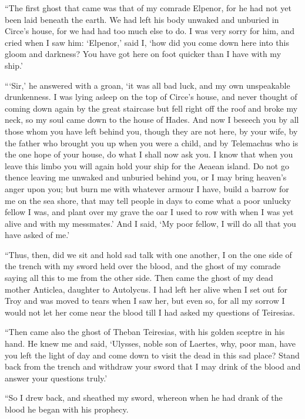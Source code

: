 “The first ghost that came was that of my comrade Elpenor, for he had not yet
been laid beneath the earth. We had left his body unwaked and unburied in
Circe’s house, for we had had too much else to do. I was very sorry for him,
and cried when I saw him: ‘Elpenor,’ said I, ‘how did you come down here into
this gloom and darkness? You have got here on foot quicker than I have with my
ship.’

“‘Sir,’ he answered with a groan, ‘it was all bad luck, and my own unspeakable
drunkenness. I was lying asleep on the top of Circe’s house, and never thought
of coming down again by the great staircase but fell right off the roof and
broke my neck, so my soul came down to the house of Hades. And now I beseech
you by all those whom you have left behind you, though they are not here, by
your wife, by the father who brought you up when you were a child, and by
Telemachus who is the one hope of your house, do what I shall now ask you. I
know that when you leave this limbo you will again hold your ship for the
Aeaean island. Do not go thence leaving me unwaked and unburied behind you, or
I may bring heaven’s anger upon you; but burn me with whatever armour I have,
build a barrow for me on the sea shore, that may tell people in days to come
what a poor unlucky fellow I was, and plant over my grave the oar I used to row
with when I was yet alive and with my messmates.’ And I said, ‘My poor fellow,
I will do all that you have asked of me.’

“Thus, then, did we sit and hold sad talk with one another, I on the one side
of the trench with my sword held over the blood, and the ghost of my comrade
saying all this to me from the other side. Then came the ghost of my dead
mother Anticlea, daughter to Autolycus. I had left her alive when I set out for
Troy and was moved to tears when I saw her, but even so, for all my sorrow I
would not let her come near the blood till I had asked my questions of
Teiresias.

“Then came also the ghost of Theban Teiresias, with his golden sceptre in his
hand. He knew me and said, ‘Ulysses, noble son of Laertes, why, poor man, have
you left the light of day and come down to visit the dead in this sad place?
Stand back from the trench and withdraw your sword that I may drink of the
blood and answer your questions truly.’

“So I drew back, and sheathed my sword, whereon when he had drank of the blood
he began with his prophecy.

